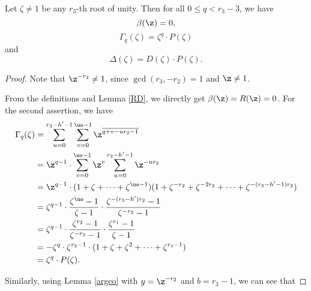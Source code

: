\begin{lemma}
Let $\zeta\neq 1$ be any $r_3$-th root of unity. Then for all $0\leq q<r_3-3$, we have $$\beta(\z)=0,$$ $$\Gamma_q(\zeta)=\zeta^{q}\cdot P(\zeta)$$ and $$\Delta(\zeta)=D(\zeta)\cdot P(\zeta).$$
\end{lemma}
\begin{proof}
Note that $\z^{-r_2}\neq 1$, since $\gcd(r_3,-r_2)=1$ and $\z\neq1$.

From the definitions and Lemma \ref{RD}, we directly get $\beta(\z)=R(\z)=0$. For the second assertion, we have
\begin{equation*}
\begin{split}
\Gamma_q(\zeta)&=\sum_{u=0}^{r_3-h'-1}\sum_{v=0}^{\uo-1}\z^{\overline{q+v-ur_2-1}}\\
&=\z^{q-1}\cdot\sum_{v=0}^{\uo-1}\z^{v}\sum_{u=0}^{r_3-h'-1}\z^{-ur_2}\\
&=\z^{q-1}\cdot(1+\zeta+\dots+\zeta^{\uo-1})(1+\zeta^{-r_2}+\zeta^{-2r_2}+\dots+\zeta^{-(r_3-h'-1)r_2})\\
&=\zeta^{q-1}\cdot\frac{\zeta^{\uo}-1}{\zeta-1}\cdot \frac{\zeta^{-(r_3-h')r_2}-1}{\zeta^{-r_2}-1}\\
&=\zeta^{q-1}\cdot\frac{\zeta^{r_2}-1}{\zeta^{-r_2}-1}\cdot \frac{\zeta^{r_1}-1}{\zeta-1}\\
&=-\zeta^{q}\cdot \zeta^{r_2-1}\cdot (1+\zeta+\zeta^2+\dots+\zeta^{r_1-1})\\
&=\zeta^{q}\cdot P(\zeta).
\end{split}
\end{equation*}

Similarly, using Lemma \ref{argeo} with $y=\z^{-r_2}$ and $b=r_3-1$, we can see that


\end{proof}
